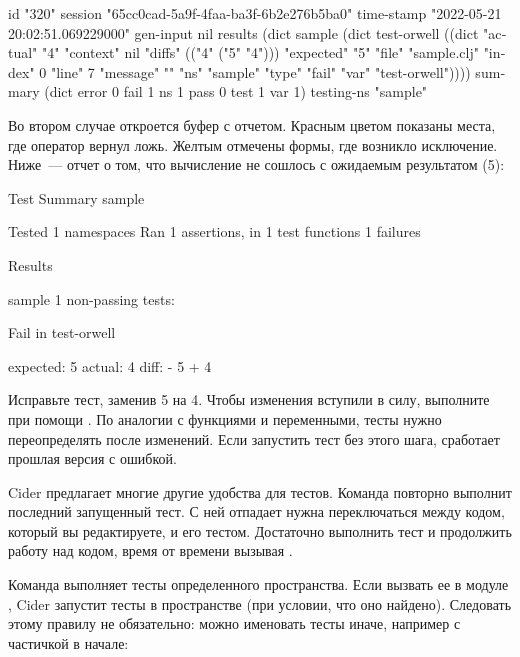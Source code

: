 \begin{english}
  \begin{text}
  id         "320"
  session    "65cc0cad-5a9f-4faa-ba3f-6b2e276b5ba0"
  time-stamp "2022-05-21 20:02:51.069229000"
  gen-input  nil
  results    (dict
               sample (dict
                        test-orwell ((dict "actual" "4\n" "context" nil "diffs"
       (("4\n"
         ("5\n" "4\n")))
       "expected" "5\n" "file" "sample.clj" "index" 0 "line" 7 "message" "" "ns" "sample" "type" "fail" "var" "test-orwell"))))
  summary    (dict
               error 0
               fail  1
               ns    1
               pass  0
               test  1
               var   1)
  testing-ns "sample"
  \end{text}
\end{english}

Во втором случае откроется буфер  с отчетом. Красным цветом показаны места, где оператор  вернул ложь. Желтым отмечены формы, где возникло исключение. Ниже~--- отчет о том, что вычисление  не сошлось с ожидаемым результатом (5):

\begin{english}
  \begin{text}
Test Summary
sample

Tested 1 namespaces
Ran 1 assertions, in 1 test functions
1 failures

Results

sample
1 non-passing tests:

Fail in test-orwell

expected: 5
  actual: 4
    diff: - 5
          + 4
  \end{text}
\end{english}

Исправьте тест, заменив 5 на 4. Чтобы изменения вступили в силу, выполните  при помощи . По аналогии с функциями и переменными, тесты нужно переопределять после изменений. Если запустить тест без этого шага, сработает прошлая версия с ошибкой.

Cider предлагает многие другие удобства для тестов. Команда  повторно выполнит последний запущенный тест. С ней отпадает нужна переключаться между кодом, который вы редактируете, и его тестом. Достаточно выполнить тест и продолжить работу над кодом, время от времени вызывая .

Команда  выполняет тесты определенного пространства. Если вызвать ее в модуле , Cider запустит тесты в пространстве  (при условии, что оно найдено). Следовать этому правилу не обязательно: можно именовать тесты иначе, например с частичкой  в начале:

